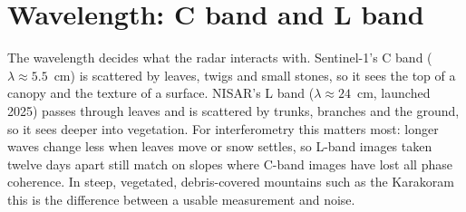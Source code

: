 \section{Wavelength: C band and L band}
The wavelength decides what the radar interacts with. Sentinel-1's C band ($\lambda \approx 5.5$~cm) is scattered by leaves, twigs and small stones, so it sees the top of a canopy and the texture of a surface. NISAR's L band ($\lambda \approx 24$~cm, launched 2025) passes through leaves and is scattered by trunks, branches and the ground, so it sees deeper into vegetation. For interferometry this matters most: longer waves change less when leaves move or snow settles, so L-band images taken twelve days apart still match on slopes where C-band images have lost all phase coherence. In steep, vegetated, debris-covered mountains such as the Karakoram this is the difference between a usable measurement and noise.

